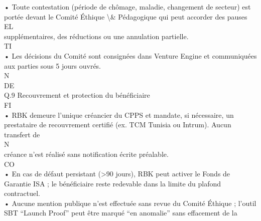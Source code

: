 • Toute contestation (période de chômage, maladie, changement de secteur) est portée devant le Comité Éthique \textbackslash{}& Pédagogique qui peut accorder des pauses\\
\vspace{0.5em}
\vspace{0.5em}
\vspace{0.5em}
\vspace{0.5em}
EL\\
supplémentaires, des réductions ou une annulation partielle.\\
\vspace{0.5em}
\vspace{0.5em}
\vspace{0.5em}
\vspace{0.5em}
TI\\
• Les décisions du Comité sont consignées dans Venture Engine et communiquées aux parties sous 5 jours ouvrés.\\
\vspace{0.5em}
\vspace{0.5em}
\vspace{0.5em}
\vspace{0.5em}
N\\
DE\\
Q.9 Recouvrement et protection du bénéficiaire\\
\vspace{0.5em}
\vspace{0.5em}
\vspace{0.5em}
\vspace{0.5em}
FI\\
• RBK demeure l’unique créancier du CPPS et mandate, si nécessaire, un prestataire de recouvrement certifié (ex. TCM Tunisia ou Intrum). Aucun transfert de\\
\vspace{0.5em}
\vspace{0.5em}
\vspace{0.5em}
N\\
créance n’est réalisé sans notification écrite préalable.\\
CO\\
• En cas de défaut persistant (\textgreater{}90 jours), RBK peut activer le Fonds de Garantie ISA ; le bénéficiaire reste redevable dans la limite du plafond contractuel.\\
\vspace{0.5em}
• Aucune mention publique n’est effectuée sans revue du Comité Éthique ; l’outil SBT “Launch Proof” peut être marqué “en anomalie” sans effacement de la\\
